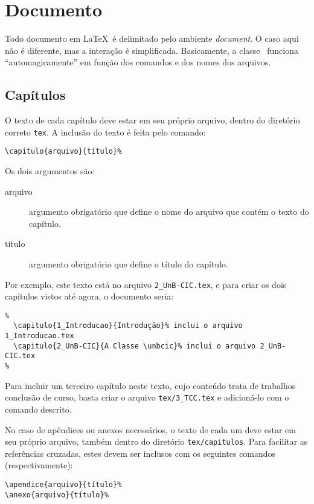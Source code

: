 \section{Documento}
Todo documento em \LaTeX\ é delimitado pelo ambiente \emph{document}. O caso aqui
não é diferente, mas a interação é simplificada. Basicamente, a classe \unbcic\
funciona ``automagicamente'' em função dos comandos e dos nomes dos arquivos.


\subsection{Capítulos}
O texto de cada capítulo deve estar em seu próprio arquivo, dentro do diretório
correto \texttt{tex}. A inclusão do texto é feita pelo comando:
\begin{verbatim}
\capitulo{arquivo}{título}%
\end{verbatim}

Os dois argumentos são:
\begin{description}%
\item[arquivo] argumento obrigatório que define o nome do arquivo que contém o
texto do capítulo.
\item[título] argumento obrigatório que define o título do capítulo.
\end{description}%

Por exemplo, este texto está no arquivo \texttt{2\_UnB-CIC.tex}, e para criar os
dois capítulos vistos até agora, o documento seria:

\begin{verbatim}
%
  \capitulo{1_Introducao}{Introdução}% inclui o arquivo 1_Introducao.tex
  \capitulo{2_UnB-CIC}{A Classe \unbcic}% inclui o arquivo 2_UnB-CIC.tex
%
\end{verbatim}

Para incluir um terceiro capítulo neste texto, cujo conteúdo trata de trabalhos
conclusão de curso, basta criar o arquivo \texttt{tex/3\_TCC.tex} e adicioná-lo
com o comando descrito.

No caso de apêndices ou anexos necessários, o texto de cada um deve estar em seu
próprio arquivo, também dentro do diretório \texttt{tex/capitulos}. Para facilitar
as referências cruzadas, estes devem ser inclusos com os seguintes comandos
(respectivamente):
\begin{verbatim}
\apendice{arquivo}{título}%
\anexo{arquivo}{título}%
\end{verbatim}

